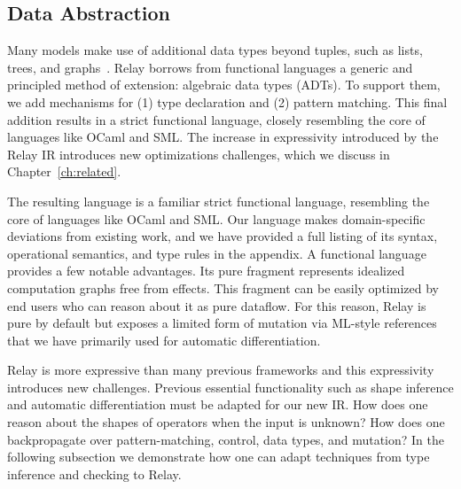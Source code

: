 \subsection*{Data Abstraction}
Many models make use of additional data types beyond
  tuples, such as lists, trees, and graphs~\citep{char-rnn, tree_lstm, graph_lstm}.
Relay borrows from functional languages
  a generic and principled method of extension:
  algebraic data types (ADTs).
To support them, we add mechanisms for
  (1) type declaration and
  (2) pattern matching.
This final addition results in a strict functional language,
  closely resembling the core of languages like OCaml and SML.
The increase in expressivity introduced by the Relay IR introduces
  new optimizations challenges, which we
  discuss in Chapter~\ref{ch:related}.

The resulting language is a familiar strict functional language,
  resembling the core of languages like OCaml and SML.
Our language makes domain-specific deviations from existing work,
  and we have provided a full listing
  of its syntax, operational semantics, and type rules
  in the appendix.
A functional language provides a few notable advantages.
Its pure fragment represents idealized computation graphs free
  from effects. This fragment can be easily optimized by end users who
  can reason about it as pure dataflow.
For this reason, Relay is pure by default but exposes a limited
  form of mutation via ML-style references that we have
  primarily used for automatic differentiation.

Relay is more expressive than many previous frameworks and this expressivity introduces new challenges.
  Previous essential functionality such
    as shape inference and automatic differentiation must be adapted for
    our new IR.
How does one reason about the shapes of operators when the input is unknown?
How does one backpropagate over pattern-matching, control, data types, and mutation?
In the following subsection we demonstrate how one can adapt techniques
  from type inference and checking to Relay.


